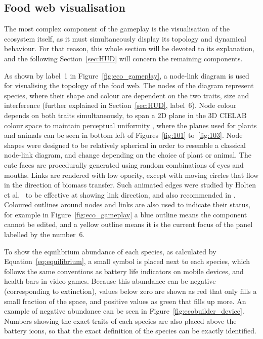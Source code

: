 \subsection{Food web visualisation}
\label{sec:eco_visualisation}
The most complex component of the gameplay is the visualisation of the ecosystem itself, as it must simultaneously display its topology and dynamical behaviour. For that reason, this whole section will be devoted to its explanation, and the following Section~\ref{sec:HUD} will concern the remaining components.

As shown by label~1 in Figure~\ref{fig:eco_gameplay}, a node-link diagram is used for visualising the topology of the food web.
The nodes of the diagram represent species, where their shape and colour are dependent on the two traits, size and interference (further explained in Section~\ref{sec:HUD}, label~6).
Node colour depends on both traits simultaneously, to span a 2D plane in the 3D CIELAB colour space to maintain perceptual uniformity \cite{Smart2019}, where the planes used for plants and animals can be seen in bottom left of Figures~\ref{fig:101} to~\ref{fig:103}.
Node shapes were designed to be relatively spherical in order to resemble a classical node-link diagram, and change depending on the choice of plant or animal. The cute faces are procedurally generated using random combinations of eyes and mouths.
Links are rendered with low opacity, except with moving circles that flow in the direction of biomass transfer. Such animated edges were studied by Holten et al.\ \cite{Holten2011} to be effective at showing link direction, and also recommended in \cite{Bach2017}.
Coloured outlines around nodes and links are also used to indicate their status, for example in Figure~\ref{fig:eco_gameplay} a blue outline means the component cannot be edited, and a yellow outline means it is the current focus of the panel labelled by the number~6.

To show the equilibrium abundance of each species, as calculated by Equation~\ref{eq:equilibrium}, a small symbol is placed next to each species, which follows the same conventions as battery life indicators on mobile devices, and health bars in video games. Because this abundance can be negative (corresponding to extinction), values below zero are shown as red that only fills a small fraction of the space, and positive values as green that fills up more. An example of negative abundance can be seen in Figure~\ref{fig:ecobuilder_device}.
Numbers showing the exact traits of each species are also placed above the battery icons, so that the exact definition of the species can be exactly identified.

